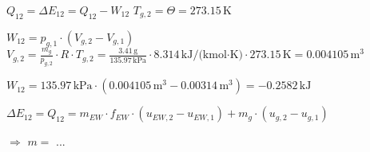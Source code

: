\( Q_{12} = \Delta E_{12} = Q_{12} - W_{12} \)  
\( T_{g,2} = \Theta = 273.15 \, \text{K} \)  

\( W_{12} = p_{g,1} \cdot (V_{g,2} - V_{g,1}) \)  
\( V_{g,2} = \frac{m_{g}}{p_{g,2}} \cdot R \cdot T_{g,2} = \frac{3.41 \, \text{g}}{135.97 \, \text{kPa}} \cdot 8.314 \, \text{kJ/(kmol·K)} \cdot 273.15 \, \text{K} = 0.004105 \, \text{m}^3 \)  

\( W_{12} = 135.97 \, \text{kPa} \cdot (0.004105 \, \text{m}^3 - 0.00314 \, \text{m}^3) = -0.2582 \, \text{kJ} \)  

\( \Delta E_{12} = Q_{12} = m_{EW} \cdot f_{EW} \cdot (u_{EW,2} - u_{EW,1}) + m_{g} \cdot (u_{g,2} - u_{g,1}) \)  

\( \Rightarrow \) \( m = \) ...